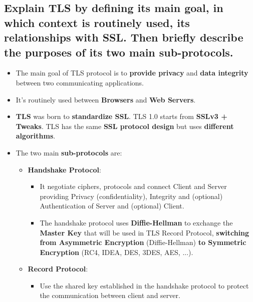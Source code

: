 \documentclass[9pt, letterpaper]{article}
\begin{document}
\subsection{Explain TLS by defining its main goal, in which context is routinely used, its relationships with SSL. Then briefly describe the purposes of its two main sub-protocols.}
\begin{itemize}
	\item The main goal of TLS protocol is to \textbf{provide privacy} and \textbf{data integrity} between two communicating applications.
	\item It's routinely used between \textbf{Browsers} and \textbf{Web Servers}.
	\item \textbf{TLS} was born to \textbf{standardize SSL}. TLS 1.0 starts from \textbf{SSLv3 + Tweaks}. TLS has the same \textbf{SSL protocol design} but uses \textbf{different algorithms}.
	\item The two main \textbf{sub-protocols} are:
	\begin{itemize}
		\item \textbf{Handshake Protocol}: 
		\begin{itemize}
			\item It negotiate ciphers, protocols and connect Client and Server providing Privacy (confidentiality), Integrity and (optional) Authentication of Server and (optional) Client. 
			\item The handshake protocol uses \textbf{Diffie-Hellman} to exchange the \textbf{Master Key} that will be used in TLS Record Protocol, \textbf{switching from Asymmetric Encryption} (Diffie-Hellman) \textbf{to Symmetric Encryption} (RC4, IDEA, DES, 3DES, AES, ...).
		\end{itemize}	
		\item \textbf{Record Protocol}: 
		\begin{itemize}
			\item Use the shared key established in the handshake protocol to protect the communication between client and server.
		\end{itemize}		 
	\end{itemize}
\end{itemize}
\end{document}
